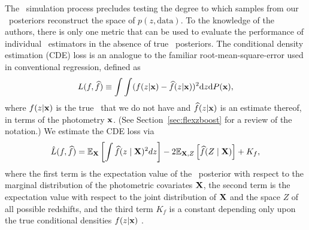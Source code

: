 The \buzz\ simulation process precludes testing the degree to which samples from our \pz\ posteriors reconstruct the space of $p(z, \mathrm{data})$.
To the knowledge of the authors, there is only one metric that can be used to evaluate the performance of individual \pzpdf\ estimators in the absence of true \pz\ posteriors.
The conditional density estimation (CDE) loss is an analogue to the familiar root-mean-square-error used in conventional regression, defined as
\begin{equation}
  \label{eq:cde-loss}
  L(f, \widehat{f}) \equiv \int \int (f(z \vert {\mathbf{x}}) - \widehat{f}(z \vert {\mathbf{x}}))^{2} \mathrm{d}z \mathrm{d}P({\mathbf{x}}) ,
\end{equation}
where $f(z \vert {\mathbf{x}})$ is the true \pzpdf\ that we do not have and $\widehat{f}(z \vert {\mathbf{x}})$ is an estimate thereof, in terms of the photometry ${\mathbf{x}}$.
(See Section~\ref{sec:flexzboost} for a review of the notation.)
We estimate the CDE loss via
\begin{equation}
  \label{eq:estimated-cde-loss}
  \hat{L}(f, \widehat{f}) = \mathbb{E}_{\mathbf{X}} \left[\int \widehat{f}(z \mid {\mathbf{X}})^{2} dz\right] - 2 \mathbb{E}_{{\mathbf{X}}, Z}\left[\widehat{f}(Z \mid {\mathbf{X}})\right] + K_{f},
\end{equation}
where the first term is the expectation value of the \pz\ posterior with respect to the marginal distribution of the photometric covariates ${\mathbf{X}}$, the second term is the expectation value with respect to the joint distribution of ${\mathbf{X}}$ and the space $Z$ of all possible redshifts, and the third term $K_{f}$ is a constant depending only upon the true conditional densities $f(z \vert {\mathbf{x}})$ \citep[Eq.~7 in][]{Izbicki:17b}. 

